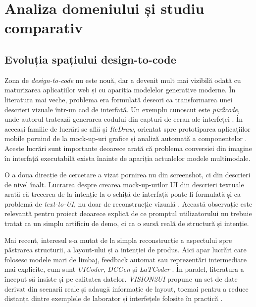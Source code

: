 \chapter{Analiza domeniului și studiu comparativ}

\section{Evoluția spațiului design-to-code}

Zona de \textit{design-to-code} nu este nouă, dar a devenit mult mai vizibilă odată cu maturizarea aplicațiilor web și cu apariția modelelor generative moderne. În literatura mai veche, problema era formulată deseori ca transformarea unei descrieri vizuale într-un cod de interfață. Un exemplu cunoscut este \textit{pix2code}, unde autorul tratează generarea codului din capturi de ecran ale interfeței \cite{beltramelli2017pix2code}. În aceeași familie de lucrări se află și \textit{ReDraw}, orientat spre prototiparea aplicațiilor mobile pornind de la mock-up-uri grafice și analiză automată a componentelor \cite{moran2018redraw}. Aceste lucrări sunt importante deoarece arată că problema conversiei din imagine în interfață executabilă exista înainte de apariția actualelor modele multimodale.

O a doua direcție de cercetare a vizat pornirea nu din screenshot, ci din descrieri de nivel înalt. Lucrarea despre crearea mock-up-urilor UI din descrieri textuale arată că trecerea de la intenție la o schiță de interfață poate fi formulată și ca problemă de \textit{text-to-UI}, nu doar de reconstrucție vizuală \cite{huang2021text2ui}. Această observație este relevantă pentru proiect deoarece explică de ce promptul utilizatorului nu trebuie tratat ca un simplu artificiu de demo, ci ca o sursă reală de structură și intenție.

Mai recent, interesul s-a mutat de la simpla reconstrucție a aspectului spre păstrarea structurii, a layout-ului și a intenției de produs. Aici apar lucrări care folosesc modele mari de limbaj, feedback automat sau reprezentări intermediare mai explicite, cum sunt \textit{UICoder}, \textit{DCGen} și \textit{LaTCoder} \cite{shen2024uicoder,wan2024dcgen,xu2025latcoder}. În paralel, literatura a început să insiste și pe calitatea datelor. \textit{VISION2UI} propune un set de date derivat din scenarii reale și adaugă informație de layout, tocmai pentru a reduce distanța dintre exemplele de laborator și interfețele folosite în practică \cite{gui2024vision2ui}.

